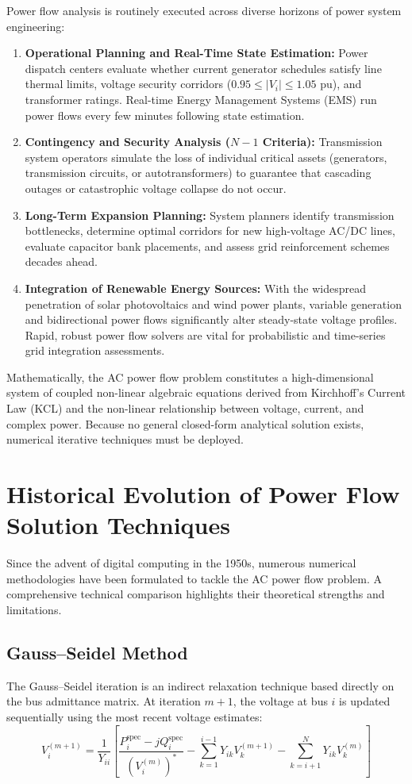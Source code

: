 \documentclass[12pt,a4paper,oneside]{report}
\begin{document}
Power flow analysis is routinely executed across diverse horizons of power system engineering:
\begin{enumerate}
    \item \textbf{Operational Planning and Real-Time State Estimation:} Power dispatch centers evaluate whether current generator schedules satisfy line thermal limits, voltage security corridors ($0.95 \le |V_i| \le 1.05\text{ pu}$), and transformer ratings. Real-time Energy Management Systems (EMS) run power flows every few minutes following state estimation.
    \item \textbf{Contingency and Security Analysis ($N-1$ Criteria):} Transmission system operators simulate the loss of individual critical assets (generators, transmission circuits, or autotransformers) to guarantee that cascading outages or catastrophic voltage collapse do not occur.
    \item \textbf{Long-Term Expansion Planning:} System planners identify transmission bottlenecks, determine optimal corridors for new high-voltage AC/DC lines, evaluate capacitor bank placements, and assess grid reinforcement schemes decades ahead.
    \item \textbf{Integration of Renewable Energy Sources:} With the widespread penetration of solar photovoltaics and wind power plants, variable generation and bidirectional power flows significantly alter steady-state voltage profiles. Rapid, robust power flow solvers are vital for probabilistic and time-series grid integration assessments.
\end{enumerate}

Mathematically, the AC power flow problem constitutes a high-dimensional system of coupled non-linear algebraic equations derived from Kirchhoff's Current Law (KCL) and the non-linear relationship between voltage, current, and complex power. Because no general closed-form analytical solution exists, numerical iterative techniques must be deployed.

\section{Historical Evolution of Power Flow Solution Techniques}
Since the advent of digital computing in the 1950s, numerous numerical methodologies have been formulated to tackle the AC power flow problem. A comprehensive technical comparison highlights their theoretical strengths and limitations.

\subsection{Gauss--Seidel Method}
The Gauss--Seidel iteration is an indirect relaxation technique based directly on the bus admittance matrix. At iteration $m+1$, the voltage at bus $i$ is updated sequentially using the most recent voltage estimates:
\begin{equation}
V_i^{(m+1)} = \frac{1}{Y_{ii}} \left[ \frac{P_i^{\text{spec}} - j Q_i^{\text{spec}}}{(V_i^{(m)})^*} - \sum_{k=1}^{i-1} Y_{ik} V_k^{(m+1)} - \sum_{k=i+1}^N Y_{ik} V_k^{(m)} \right]
\end{equation}
\end{document}
